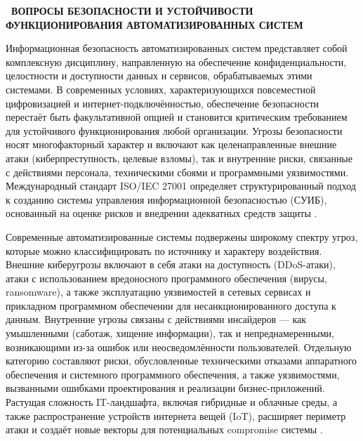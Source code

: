 \documentclass{SibFU-docs}
\begin{document}
\newpage
{}
\begin{center}\textbf{\thesection\ ВОПРОСЫ БЕЗОПАСНОСТИ И УСТОЙЧИВОСТИ ФУНКЦИОНИРОВАНИЯ АВТОМАТИЗИРОВАННЫХ СИСТЕМ}\end{center}
\vspace*{-1.5em}

Информационная безопасность автоматизированных систем представляет собой комплексную дисциплину, направленную на обеспечение конфиденциальности, целостности и доступности данных и сервисов, обрабатываемых этими системами. В современных условиях, характеризующихся повсеместной цифровизацией и интернет-подключённостью, обеспечение безопасности перестаёт быть факультативной опцией и становится критическим требованием для устойчивого функционирования любой организации. Угрозы безопасности носят многофакторный характер и включают как целенаправленные внешние атаки (киберпреступность, целевые взломы), так и внутренние риски, связанные с действиями персонала, техническими сбоями и программными уязвимостями. Международный стандарт ISO/IEC 27001 определяет структурированный подход к созданию системы управления информационной безопасностью (СУИБ), основанный на оценке рисков и внедрении адекватных средств защиты \cite{iso27001}.


Современные автоматизированные системы подвержены широкому спектру угроз, которые можно классифицировать по источнику и характеру воздействия. Внешние киберугрозы включают в себя атаки на доступность (DDoS-атаки), атаки с использованием вредоносного программного обеспечения (вирусы, ransomware), а также эксплуатацию уязвимостей в сетевых сервисах и прикладном программном обеспечении для несанкционированного доступа к данным. Внутренние угрозы связаны с действиями инсайдеров — как умышленными (саботаж, хищение информации), так и непреднамеренными, возникающими из-за ошибок или неосведомлённости пользователей. Отдельную категорию составляют риски, обусловленные техническими отказами аппаратного обеспечения и системного программного обеспечения, а также уязвимостями, вызванными ошибками проектирования и реализации бизнес-приложений. Растущая сложность IT-ландшафта, включая гибридные и облачные среды, а также распространение устройств интернета вещей (IoT), расширяет периметр атаки и создаёт новые векторы для потенциальных compromise системы \cite{nist}.
\end{document}
